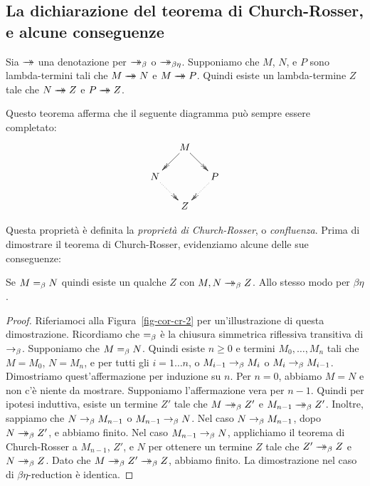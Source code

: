 \documentclass{article}
\begin{document}
\subsection{La dichiarazione del teorema di Church-Rosser, e alcune conseguenze}

\begin{un-theorem}\label{thm-church-rosser}
  Sia $\mathrel{\rightarrow\!\!\!\!\!\rightarrow}$ una denotazione per $\mathrel{\rightarrow\!\!\!\!\!\rightarrow}_{\beta}$ o $\mathrel{\rightarrow\!\!\!\!\!\rightarrow}_{\beta\eta}$.  Supponiamo che 
  $M$, $N$, e $P$ sono lambda-termini tali che $M\mathrel{\rightarrow\!\!\!\!\!\rightarrow} N$ e $M\mathrel{\rightarrow\!\!\!\!\!\rightarrow} P$. Quindi
  esiste un lambda-termine $Z$ tale che $N\mathrel{\rightarrow\!\!\!\!\!\rightarrow} Z$ e $P\mathrel{\rightarrow\!\!\!\!\!\rightarrow} Z$.
\end{un-theorem}

Questo teorema afferma che il seguente diagramma
pu\`o sempre essere completato:
\[ \xymatrix@dr{M\ar@{->>}[r]\ar@{->>}[d] & P\ar@{.>>}[d]\\ N\ar@{.>>}[r] & Z}
\]

Questa propriet\`a \`e definita la {\em propriet\`a di Church-Rosser}, o {\em
	confluenza}. Prima di dimostrare il teorema di Church-Rosser,
evidenziamo alcune delle sue conseguenze:

\begin{corollary}\label{cor-cr-2}
  Se $M=_{\beta} N$ quindi esiste un qualche $Z$ con $M,N\mathrel{\rightarrow\!\!\!\!\!\rightarrow}_{\beta}
  Z$. Allo stesso modo per $\beta\eta$.
\end{corollary}

\begin{proof}
  Riferiamoci alla Figura~\ref{fig-cor-cr-2} per un'illustrazione
  di questa dimostrazione. Ricordiamo che $=_{\beta}$ \`e la chiusura simmetrica riflessiva
  transitiva di $\rightarrow_{\beta}$. Supponiamo che $M=_{\beta} N$. Quindi esiste $n\geq
  0$ e termini $M_0,\ldots,M_n$ tali che $M=M_0$, $N=M_n$, e per
  tutti gli $i=1\ldots n$, o $M_{i-1}\rightarrow_{\beta} M_{i}$ o $M_{i}\rightarrow_{\beta}
  M_{i-1}$.  Dimostriamo quest'affermazione per induzione su $n$. Per $n=0$, abbiamo $M=N$ e 
  non c'\`e niente da mostrare. Supponiamo l'affermazione vera per $n-1$. 
  Quindi per ipotesi induttiva, esiste un termine
  $Z'$ tale che $M\mathrel{\rightarrow\!\!\!\!\!\rightarrow}_{\beta} Z'$ e $M_{n-1}\mathrel{\rightarrow\!\!\!\!\!\rightarrow}_{\beta} Z'$. Inoltre, sappiamo
  che $N\rightarrow_{\beta} M_{n-1}$ o $M_{n-1}\rightarrow_{\beta} N$. Nel caso $N\rightarrow_{\beta}
  M_{n-1}$, dopo $N\mathrel{\rightarrow\!\!\!\!\!\rightarrow}_{\beta} Z'$, e abbiamo finito. Nel caso $M_{n-1}\rightarrow_{\beta}
  N$, applichiamo il teorema di Church-Rosser a $M_{n-1}$, $Z'$, e $N$
  per ottenere un termine $Z$ tale che $Z'\mathrel{\rightarrow\!\!\!\!\!\rightarrow}_{\beta} Z$ e $N\mathrel{\rightarrow\!\!\!\!\!\rightarrow}_{\beta} Z$. Dato che
  $M\redbs Z'\redbs Z$, abbiamo finito. La dimostrazione nel caso di
  $\beta\eta$-reduction \`e identica.\eot
\end{proof}
\end{document}
